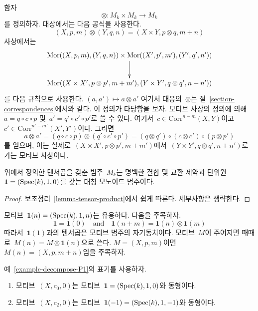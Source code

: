 \noindent
함자
$$
\otimes : M_k \times M_k \longrightarrow M_k
$$
를 정의하자. 대상에서는 다음 공식을 사용한다.
$$
(X, p, m) \otimes (Y, q, n) = (X \times Y, p \otimes q, m + n)
$$
사상에서는
$$
\xymatrix{
\Mor((X, p, m), (Y, q, n)) \times
\Mor((X', p', m'), (Y', q', n')) \ar[d] \\
\Mor(
(X \times X', p \otimes p', m + m'),
(Y \times Y', q \otimes q', n + n'))
}
$$
를 다음 규칙으로 사용한다.
$(a, a') \longmapsto a \otimes a'$ 여기서 대응의\  $\otimes$는 절\ 
\ref{section-correspondences}에서와 같다. 이 정의가 타당함을 보자.
모티브 사상의 정의에 의해\ 
$a = q \circ c \circ p$ 및\  $a' = q' \circ c' \circ p'$로 쓸 수 있다.
여기서\  $c \in \text{Corr}^{n - m}(X, Y)$이고\ 
$c' \in \text{Corr}^{n' - m'}(X', Y')$이다. 그러면
$$
a \otimes a' =
(q \circ c \circ p) \otimes (q' \circ c' \circ p') =
(q \otimes q') \circ (c \otimes c') \circ (p \otimes p')
$$
를 얻으며, 이는 실제로\ 
$(X \times X', p \otimes p', m + m')$에서\ 
$(Y \times Y', q \otimes q', n + n')$로 가는 모티브 사상이다.

\begin{lemma}
\label{lemma-motives-monoidal}
위에서 정의한 텐서곱을 갖춘 범주\  $M_k$는 명백한 결합 및 교환 제약과
단위원\  $\mathbf{1} = (\mathop{\mathrm{Spec}}(k), 1, 0)$를 갖는 대칭 모노이드 범주이다.
\end{lemma}

\begin{proof}
보조정리\  \ref{lemma-tensor-product}에서 쉽게 따른다. 세부사항은 생략한다.
\end{proof}

\noindent
모티브\  $\mathbf{1}(n) = (\mathop{\mathrm{Spec}}(k), 1, n)$는 유용하다. 다음을 주목하자.
$$
\mathbf{1} = \mathbf{1}(0)
\quad\text{and}\quad
\mathbf{1}(n + m) = \mathbf{1}(n) \otimes \mathbf{1}(m)
$$
따라서\  $\mathbf{1}(1)$과의 텐서곱은 모티브 범주의 자기동치이다.
모티브\  $M$이 주어지면 때때로\  $M(n) = M \otimes \mathbf{1}(n)$으로 쓴다.
$M = (X, p, m)$이면\  $M(n) = (X, p, m + n)$임을 주목하자.

\begin{lemma}
\label{lemma-inverse-h2}
예\  \ref{example-decompose-P1}의 표기를 사용하자.
\begin{enumerate}
\item
모티브\  $(X, c_0, 0)$는 모티브\  $\mathbf{1} = (\mathop{\mathrm{Spec}}(k), 1, 0)$와 동형이다.
\item
모티브\  $(X, c_2, 0)$는 모티브\ 
$\mathbf{1}(-1) = (\mathop{\mathrm{Spec}}(k), 1, -1)$와 동형이다.
\end{enumerate}
\end{lemma}

